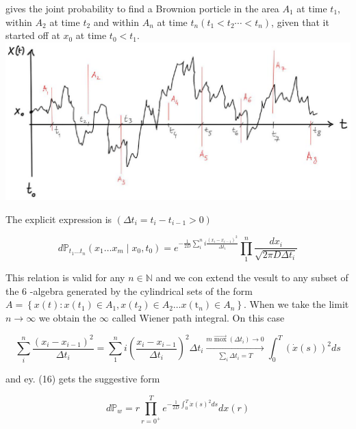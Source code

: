 \documentclass[10pt]{article}
\begin{document}
gives the joint probability to find a Brownion porticle in the area $A_{1}$ at time $t_{1}$, within $A_{2}$ at time $t_{2}$ and within $A_{n}$ at time $t_{n}\left(t_{1}<t_{2} \cdots<t_{n}\right)$, given that it started off at $x_{0}$ at time $t_{0}<t_{1}$.\\
\includegraphics[max width=\textwidth, center]{2025_10_17_55d6813539323d2293f0g-2}

The explicit expression is $\left(\Delta t_{i}=t_{i}-t_{i-1}>0\right)$


\begin{equation*}
d \mathbb{P}_{t_{1} \ldots t_{n}}\left(x_{1} \ldots x_{m} \mid x_{0}, t_{0}\right)=e^{-\frac{1}{2 D} \sum_{i}^{n} i \frac{\left(x_{i}-x_{i-1}\right)^{2}}{\Delta t_{i}}} \prod_{1}^{n} \frac{d x_{i}}{\sqrt{2 \pi D \Delta t_{i}}} \tag{16}
\end{equation*}


This relation is valid for any $n \in \mathbb{N}$ and we con extend the vesult to any subset of the 6 -algebra generated by the cylindrical sets of the form $A=\left\{x(t): x\left(t_{1}\right) \in A_{1}, x\left(t_{2}\right) \in A_{2}\right. \left.\ldots x\left(\mathrm{t}_{n}\right) \in A_{n}\right\}$. When we take the limit $n \rightarrow \infty$ we obtain the $\infty$ called Wiener path integral. On this case

$$
\sum_{i}^{n} \frac{\left(x_{i}-x_{i-1}\right)^{2}}{\Delta t_{i}}=\sum_{1}^{n} i\left(\frac{x_{i}-x_{i-1}}{\Delta t_{i}}\right)^{2} \Delta t_{i} \xrightarrow[\sum_{i} \Delta t_{i}=T]{m \overrightarrow{\operatorname{mox}}\left(\Delta t_{i}\right) \rightarrow 0} \int_{0}^{T}(\dot{x}(s))^{2} d s
$$

and ey. (16) gets the suggestive form


\begin{equation*}
d \mathbb{P}_{w}=r \prod_{r=0^{+}}^{T} e^{-\frac{1}{2 D} \int_{0}^{T} \dot{x}(s)^{2} d s} d x(r) \tag{17}
\end{equation*}
\end{document}
